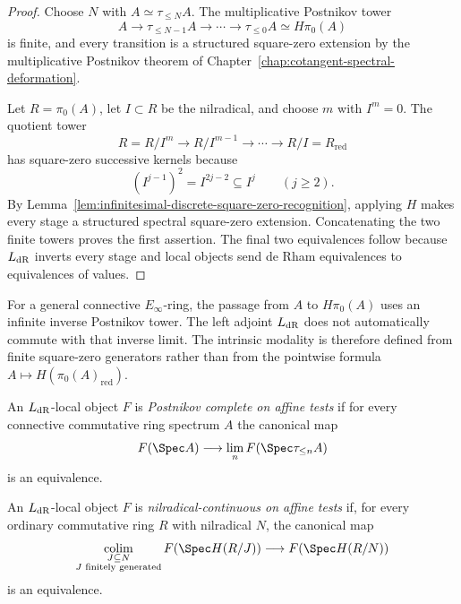 \begin{proof}
Choose $N$ with $A\simeq\tau_{\leq N}A$.  The multiplicative Postnikov tower
\[
    A\to\tau_{\leq N-1}A\to\cdots\to\tau_{\leq0}A\simeq H\pi_0(A)
\]
is finite, and every transition is a structured square-zero extension by the
multiplicative Postnikov theorem of
Chapter~\ref{chap:cotangent-spectral-deformation}.

Let $R=\pi_0(A)$, let $I\subset R$ be the nilradical, and choose $m$ with
$I^m=0$.  The quotient tower
\[
    R=R/I^m\to R/I^{m-1}\to\cdots\to R/I=R_{\mathrm{red}}
\]
has square-zero successive kernels because
\[
    (I^{j-1})^2=I^{2j-2}\subseteq I^j
    \qquad(j\geq2).
\]
By Lemma~\ref{lem:infinitesimal-discrete-square-zero-recognition}, applying
$H$ makes every stage a structured spectral square-zero extension.
Concatenating the two finite towers proves the first assertion.  The final
two equivalences follow because $L_{\mathrm{dR}}$ inverts every stage and local
objects send de Rham equivalences to equivalences of values.
\end{proof}

\begin{remark}
\label{rem:infinitesimal-infinite-postnikov}
For a general connective $E_\infty$-ring, the passage from $A$ to $H\pi_0(A)$
uses an infinite inverse Postnikov tower.  The left adjoint $L_{\mathrm{dR}}$ does not
automatically commute with that inverse limit.  The intrinsic modality is
therefore defined from finite square-zero generators rather than from the
pointwise formula $A\mapsto H(\pi_0(A)_{\mathrm{red}})$.
\end{remark}

\begin{definition}
\label{def:infinitesimal-postnikov-complete}
An $L_{\mathrm{dR}}$-local object $F$ is \emph{Postnikov complete on affine tests} if
for every connective commutative ring spectrum $A$ the canonical map
\[
    F(\Spec A)
    \longrightarrow
    \lim_nF(\Spec\tau_{\leq n}A)
\]
is an equivalence.
\end{definition}

\begin{definition}
\label{def:infinitesimal-nilradical-continuity}
An $L_{\mathrm{dR}}$-local object $F$ is \emph{nilradical-continuous on affine tests}
if, for every ordinary commutative ring $R$ with nilradical $N$, the canonical
map
\[
    \colim_{\substack{J\subseteq N\\J\text{ finitely generated}}}
    F(\Spec H(R/J))
    \longrightarrow
    F(\Spec H(R/N))
\]
is an equivalence.
\end{definition}

